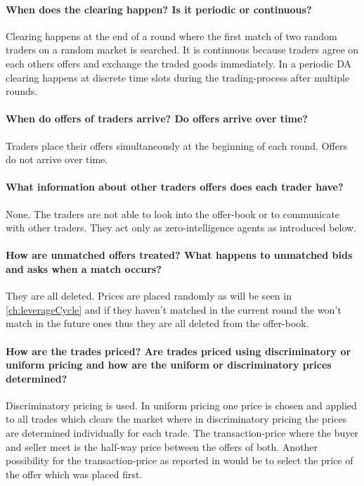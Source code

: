 \documentclass[../Bachelorarbeit.tex]{subfiles}
\begin{document}
\paragraph{When does the clearing happen? Is it periodic or continuous?} Clearing happens at the end of a round where the first match of two random traders on a random market is searched. It is continuous because traders agree on each others offers and exchange the traded goods immediately. In a periodic DA clearing happens at discrete time slots during the trading-process after multiple rounds.

\paragraph{When do offers of traders arrive? Do offers arrive over time?} Traders place their offers simultaneously at the beginning of each round. Offers do not arrive over time.

\paragraph{What information about other traders offers does each trader have?} None. The traders are not able to look into the offer-book or to communicate with other traders. They act only as \gls{zero-intelligence agents} as introduced below.

\paragraph{How are unmatched offers treated? What happens to unmatched bids and asks when a match occurs?} They are all deleted. Prices are placed randomly as will be seen in \ref{ch:leverageCycle} and if they haven't matched in the current round the won't match in the future ones thus they are all deleted from the offer-book.

\paragraph{How are the trades priced? Are trades priced using discriminatory or uniform pricing and how are the uniform or discriminatory prices determined?} Discriminatory pricing is used. In uniform pricing one price is chosen and applied to all trades which clears the market where in discriminatory pricing the prices are determined individually for each trade. The \gls{transaction-price} where the buyer and seller meet is the half-way price between the offers of both. Another possibility for the transaction-price as reported in \cite{GodeSunder1993} would be to select the price of the offer which was placed first.
\end{document}
